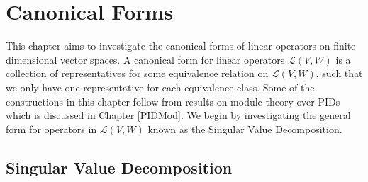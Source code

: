 \chapter{Canonical Forms}\label{CanonicalForms}

This chapter aims to investigate the canonical forms of linear operators on finite dimensional vector spaces. A canonical form for linear operators $\mathcal{L}(V,W)$ is a collection of representatives for some equivalence relation on $\mathcal{L}(V,W)$, such that we only have one representative for each equivalence class. Some of the constructions in this chapter follow from results on module theory over PIDs which is discussed in Chapter \ref{PIDMod}. We begin by investigating the general form for operators in $\mathcal{L}(V,W)$ known as the Singular Value Decomposition.

\section{Singular Value Decomposition}\label{sec:SVD}


